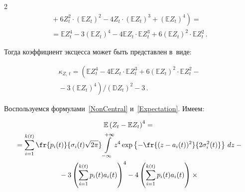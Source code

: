 \begin{multicols}{2}
\begin{multline*}
\left.{}+6Z_t^2\cdot

\left(\mathbb{E} Z_t\right)^2-4Z_t\cdot \left(\mathbb{E} Z_t\right)^3+

\left(\mathbb{E} Z_t\right)^4\right)={}\\

{}=\mathbb{E} Z_t^4-3\left(\mathbb{E} Z_t\right)^4-

4\mathbb{E} Z_t\cdot \mathbb{E} Z_t^3+

6\left(\mathbb{E} Z_t\right)^2\cdot \mathbb{E} Z_t^2\,.

\end{multline*}



Тогда коэффициент эксцесса может быть представлен в~виде:

\begin{multline}

\kappa_{Z,\,t}=\left(\mathbb{E} Z_t^4-4\mathbb{E} Z_t\cdot 

\mathbb{E} Z_t^3+6\left(\mathbb{E} Z_t\right)^2\cdot 

\mathbb{E} Z_t^2-{}\right.\\

\left.{}-3\left(\mathbb{E} Z_t\right)^4\right)\Big/

\left(\mathbb{D} Z_t\right)^2-3\,.

\label{Kurt}

\end{multline}



Воспользуемся формулами~\eqref{NonCentral} и~\eqref{Expectation}. Имеем:

\begin{multline*}

\mathbb{E} \left(Z_t-\mathbb{E} Z_t\right)^4={}\\

{}=

\sum\limits_{i=1}^{k(t)} \fr{p_i(t)}{\sigma_i(t)\sqrt{2\pi}} %


\int\limits_{-\infty}^{+\infty} z^4\exp\left\{-\fr{(z-a_i(t))^2}

{2\sigma_i^2(t)}\right\} \,dz-{}\\

{}-

3\left(\sum\limits_{i=1}^{k(t)} p_i(t) a_i(t)\right)^4-

4\left(\sum\limits_{i=1}^{k(t)} p_i(t) a_i(t)\right) \times{}\\


\end{multline*}
\end{multicols}
